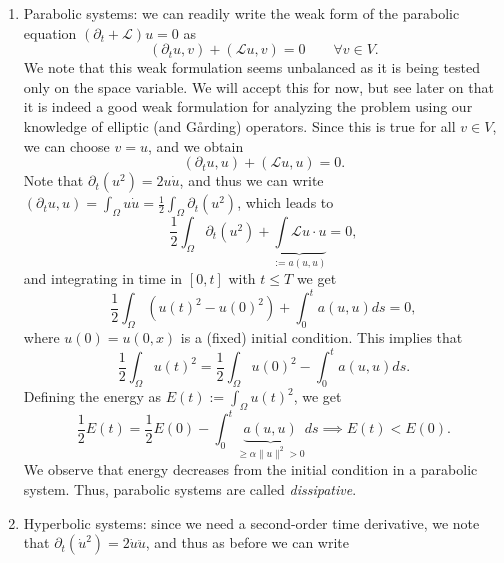 \documentclass{article}
\begin{document}
\begin{enumerate}
    \item Parabolic systems: we can readily write the weak form of the parabolic equation $(\partial_t + \mathcal{L})u=0$ as
    \begin{equation*}
        (\partial_t u, v) + (\mathcal{L}u, v) = 0 \qquad \forall v\in V.
    \end{equation*}
    We note that this weak formulation seems unbalanced as it is being tested only on the space variable. We will accept this for now, but see later on that it is indeed a good weak formulation for analyzing the problem using our knowledge of elliptic (and Gårding) operators. Since this is true for all $v\in V$, we can choose $v=u$, and we obtain
    \begin{equation*}
        (\partial_t u, u) + (\mathcal{L}u,u) = 0.
    \end{equation*}
    Note that $\partial_t(u^2) = 2u\dot{u}$, and thus we can write $(\partial_t u, u) = \int_\Omega u\dot{u} = \frac{1}{2}\int_\Omega \partial_t (u^2)$, which leads to
    \begin{equation*}
        \frac{1}{2}\int_\Omega \partial_t (u^2) + \underbrace{\int \mathcal{L}u \cdot u}_{:= a(u,u)} = 0, 
    \end{equation*}
    and integrating in time in $[0,t]$ with $t\leq T$ we get
    \begin{equation*}
        \frac{1}{2} \int_\Omega (u(t)^2-u(0)^2)  + \int_0^t a(u,u)ds = 0,
    \end{equation*}
    where $u(0) = u(0,x)$ is a (fixed) initial condition. This implies that
    \begin{equation*}
        \frac{1}{2}\int_\Omega u(t)^2 =  \frac{1}{2} \int_\Omega u(0)^2 - \int_0^t a(u,u)ds.
    \end{equation*}
    Defining the energy as $E(t) := \int_\Omega u(t)^2$, we get
    \begin{equation*}
        \frac{1}{2}E(t) = \frac{1}{2}E(0) - \int_0^t \underbrace{a(u,u)}_{\geq \alpha\|u\|^2>0} ds \implies \boxed{E(t) < E(0)}.
    \end{equation*}
    We observe that energy decreases from the initial condition in a parabolic system. Thus, parabolic systems are called \textit{dissipative}.
    \item Hyperbolic systems: since we need a second-order time derivative, we note that $\partial_t(\dot{u}^2) = 2\dot{u}\ddot{u}$, and thus as before we can write
    \begin{equation*}

\end{equation*}
\end{enumerate}
\end{document}
